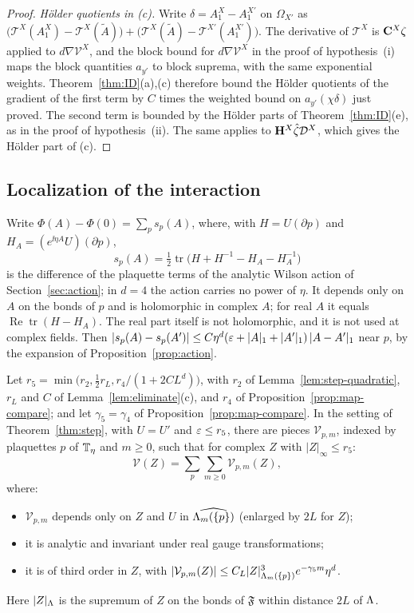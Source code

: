 \begin{proof}
\emph{H\"older quotients in (c).} Write $\delta=A_1^X-A_1^{X'}$ on $\Omega_{X'}$ as $\big(\mathcal T^X(A^X_1)-\mathcal T^X(\tilde A)\big)+\big(\mathcal T^X(\tilde A)-\mathcal T^{X'}(A^{X'}_1)\big)$. The derivative of $\mathcal T^X$ is $\mathbf C^X\zeta$ applied to $d\nabla\mathcal V^X$, and the block bound for $d\nabla\mathcal V^X$ in the proof of hypothesis~(i) maps the block quantities $a_{y'}$ to block suprema, with the same exponential weights. Theorem~\ref{thm:ID}(a),(c) therefore bound the H\"older quotients of the gradient of the first term by $C$ times the weighted bound on $a_{y'}(\chi\delta)$ just proved. The second term is bounded by the H\"older parts of Theorem~\ref{thm:ID}(e), as in the proof of hypothesis~(ii). The same applies to $\mathbf H^X\hat\zeta\mathcal D^X$, which gives the H\"older part of (c).
\end{proof}

\subsection{Localization of the interaction}\label{ss:39.3}

Write $\Phi(A)-\Phi(0)=\sum_ps_p(A)$, where, with $H=U(\partial p)$ and $H_A=(e^{\ii\eta A}U)(\partial p)$,
\[
s_p(A)=\tfrac12\operatorname{tr}\big(H+H^{-1}-H_A-H_A^{-1}\big)
\]
is the difference of the plaquette terms of the analytic Wilson action of Section~\ref{sec:action}; in $d=4$ the action carries no power of $\eta$. It depends only on $A$ on the bonds of $p$ and is holomorphic in complex $A$; for real $A$ it equals $\operatorname{Re}\operatorname{tr}(H-H_A)$. The real part itself is not holomorphic, and it is not used at complex fields. Then $|s_p(A)-s_p(A')|\le C\eta^d(\varepsilon+|A|_1+|A'|_1)\,|A-A'|_1$ near $p$, by the expansion of Proposition~\ref{prop:action}.

\begin{theorem}\label{thm:interaction-local}
Let $r_5=\min\big(r_2,\frac12r_L,r_4/(1+2CL^d)\big)$, with $r_2$ of Lemma~\ref{lem:step-quadratic}, $r_L$ and $C$ of Lemma~\ref{lem:eliminate}(c), and $r_4$ of Proposition~\ref{prop:map-compare}; and let $\gamma_5=\gamma_4$ of Proposition~\ref{prop:map-compare}. In the setting of Theorem~\ref{thm:step}, with $U=U'$ and $\varepsilon\le r_5$, there are pieces $\mathcal V_{p,m}$, indexed by plaquettes $p$ of $\mathbb T_\eta$ and $m\ge0$, such that for complex $Z$ with $|Z|_\infty\le r_5$:
\[
\mathcal V(Z)=\sum_p\sum_{m\ge0}\mathcal V_{p,m}(Z),
\]
where:
\begin{itemize}
\item $\mathcal V_{p,m}$ depends only on $Z$ and $U$ in $\widehat{\Lambda_m(\{p\})}$ (enlarged by $2L$ for $Z$);
\item it is analytic and invariant under real gauge transformations;
\item it is of third order in $Z$, with $|\mathcal V_{p,m}(Z)|\le C_L|Z|^3_{\Lambda_m(\{p\})}e^{-\gamma_5m}\eta^d$.
\end{itemize}
Here $|Z|_{\Lambda}$ is the supremum of $Z$ on the bonds of $\mathfrak F$ within distance $2L$ of $\Lambda$.
\end{theorem}

